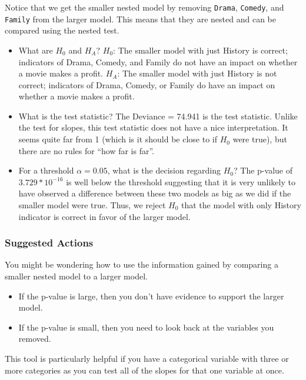\documentclass[
]{book}
\providecommand{\tightlist}{%
  \setlength{\itemsep}{0pt}\setlength{\parskip}{0pt}}
\begin{document}
Notice that we get the smaller nested model by removing \texttt{Drama}, \texttt{Comedy}, and \texttt{Family} from the larger model. This means that they are nested and can be compared using the nested test.

\begin{itemize}
\item
  What are \(H_0\) and \(H_A\)?
  \(H_0\): The smaller model with just History is correct; indicators of Drama, Comedy, and Family do not have an impact on whether a movie makes a profit.
  \(H_A\): The smaller model with just History is not correct; indicators of Drama, Comedy, or Family do have an impact on whether a movie makes a profit.
\item
  What is the test statistic?
  The Deviance = 74.941 is the test statistic. Unlike the test for slopes, this test statistic does not have a nice interpretation. It seems quite far from 1 (which is it should be close to if \(H_0\) were true), but there are no rules for ``how far is far''.
\item
  For a threshold \(\alpha = 0.05\), what is the decision regarding \(H_0\)?
  The p-value of \(3.729 * 10^{-16}\) is well below the threshold suggesting that it is very unlikely to have observed a difference between these two models as big as we did if the smaller model were true. Thus, we reject \(H_0\) that the model with only History indicator is correct in favor of the larger model.
\end{itemize}

\subsubsection{Suggested Actions}\label{suggested-actions-1}

You might be wondering how to use the information gained by comparing a smaller nested model to a larger model.

\begin{itemize}
\tightlist
\item
  If the p-value is large, then you don't have evidence to support the larger model.
\item
  If the p-value is small, then you need to look back at the variables you removed.
\end{itemize}

This tool is particularly helpful if you have a categorical variable with three or more categories as you can test all of the slopes for that one variable at once.
\end{document}
